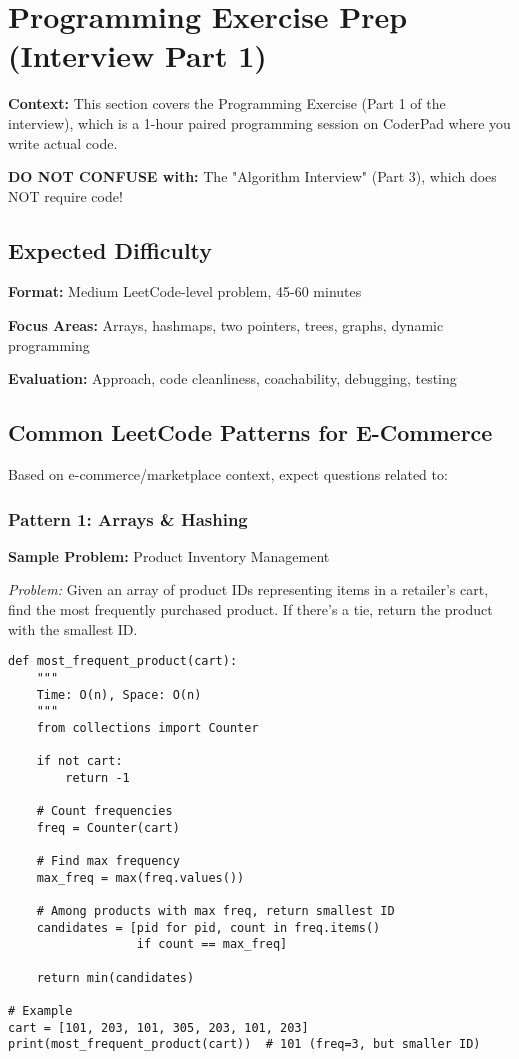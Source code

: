 \documentclass[11pt,letterpaper]{article}
\begin{document}
\section{Programming Exercise Prep (Interview Part 1)}

\textbf{Context:} This section covers the Programming Exercise (Part 1 of the interview), which is a 1-hour paired programming session on CoderPad where you write actual code.

\textbf{DO NOT CONFUSE with:} The "Algorithm Interview" (Part 3), which does NOT require code!

\subsection{Expected Difficulty}

\textbf{Format:} Medium LeetCode-level problem, 45-60 minutes

\textbf{Focus Areas:} Arrays, hashmaps, two pointers, trees, graphs, dynamic programming

\textbf{Evaluation:} Approach, code cleanliness, coachability, debugging, testing

\subsection{Common LeetCode Patterns for E-Commerce}

Based on e-commerce/marketplace context, expect questions related to:

\subsubsection{Pattern 1: Arrays \& Hashing}

\textbf{Sample Problem:} Product Inventory Management

\textit{Problem:} Given an array of product IDs representing items in a retailer's cart, find the most frequently purchased product. If there's a tie, return the product with the smallest ID.

\begin{lstlisting}
def most_frequent_product(cart):
    """
    Time: O(n), Space: O(n)
    """
    from collections import Counter

    if not cart:
        return -1

    # Count frequencies
    freq = Counter(cart)

    # Find max frequency
    max_freq = max(freq.values())

    # Among products with max freq, return smallest ID
    candidates = [pid for pid, count in freq.items()
                  if count == max_freq]

    return min(candidates)

# Example
cart = [101, 203, 101, 305, 203, 101, 203]
print(most_frequent_product(cart))  # 101 (freq=3, but smaller ID)
\end{lstlisting}
\end{document}
